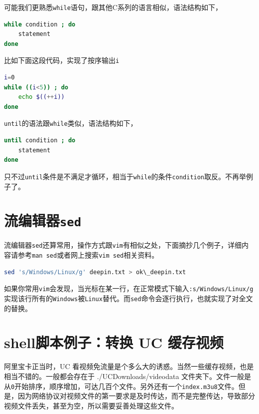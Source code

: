 \documentclass[doctor,openright,twoside]{sjtuthesis}
\newcommand{\passthrough}[1]{#1}
\theoremstyle{plain}
\theoremstyle{definition}
\theoremstyle{remark}
\theoremstyle{ocrenumbox}
\theoremstyle{plain}
\begin{document}
可能我们更熟悉\passthrough{\lstinline!while!}语句，跟其他C系列的语言相似，语法结构如下，

\begin{lstlisting}[language=bash]
while condition ; do
    statement
done
\end{lstlisting}

比如下面这段代码，实现了按序输出\passthrough{\lstinline!i!}

\begin{lstlisting}[language=bash]
i=0
while ((i<5)) ; do
    echo $((++i))
done
\end{lstlisting}

\passthrough{\lstinline!until!}的语法跟\passthrough{\lstinline!while!}类似，语法结构如下，

\begin{lstlisting}[language=bash]
until condition ; do
    statement
done
\end{lstlisting}

只不过\passthrough{\lstinline!until!}条件是不满足才循环，相当于\passthrough{\lstinline!while!}的条件\passthrough{\lstinline!condition!}取反。不再举例子了。

\hypertarget{sed}{%
\section{\texorpdfstring{流编辑器\texttt{sed}}{流编辑器sed}}\label{sed}}

流编辑器\passthrough{\lstinline!sed!}还算常用，操作方式跟\passthrough{\lstinline!vim!}有相似之处，下面摘抄几个例子，详细内容请参考\passthrough{\lstinline!man sed!}或者网上搜索\passthrough{\lstinline!vim sed!}相关资料。

\begin{lstlisting}[language=bash]
sed 's/Windows/Linux/g' deepin.txt > ok\_deepin.txt
\end{lstlisting}

如果你常用\passthrough{\lstinline!vim!}会发现，当光标在某一行，在正常模式下输入\passthrough{\lstinline!:s/Windows/Linux/g!}实现该行所有的\passthrough{\lstinline!Windows!}被\passthrough{\lstinline!Linux!}替代。而\passthrough{\lstinline!sed!}命令会逐行执行，也就实现了对全文的替换。

\hypertarget{shell-uc-}{%
\section{shell脚本例子：转换 UC 缓存视频}\label{shell-uc-}}

阿里宝卡正当时，UC 看视频免流量是个多么大的诱惑。当然一些缓存视频，也是相当不错的。一般都会存在于 ./UCDownloads/videodata 文件夹下。文件一般是从\passthrough{\lstinline!0!}开始排序，顺序增加，可达几百个文件。另外还有一个\passthrough{\lstinline!index.m3u8!}文件。但是，因为网络协议对视频文件的第一要求是及时传达，而不是完整传达，导致部分视频文件丢失，甚至为空，所以需要妥善处理这些文件。
\end{document}
